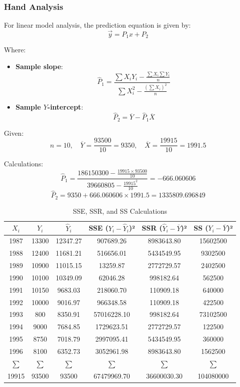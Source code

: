 \documentclass[12pt]{article}
\begin{document}
\subsubsection*{Hand Analysis}

For linear model analysis, the prediction equation is given by:
\[
\vec{y} = P_1 x + P_2
\]

Where:

\begin{itemize}
    \item \textbf{Sample slope}:
    \[
    \hat{P}_1 = \frac{\sum X_i Y_i - \frac{\sum X_i \sum Y_i}{n}}{\sum X_i^2 - \frac{(\sum X_i)^2}{n}}
    \]
    \item \textbf{Sample \( Y \)-intercept}:
    \[
    \hat{P}_2 = \overline{Y} - \hat{P}_1 \overline{X}
    \]
\end{itemize}

Given:
\[
n = 10, \quad \overline{Y} = \frac{93500}{10} = 9350, \quad \overline{X} = \frac{19915}{10} = 1991.5
\]

Calculations:
\[
\hat{P}_1 = \frac{186150300 - \frac{19915 \times 93500}{10}}{39660805 - \frac{19915^2}{10}} = -666.060606
\]
\[
\hat{P}_2 = 9350 + 666.060606 \times 1991.5 = 1335809.696849
\]

\begin{table}[h!]
    \centering
    \caption{SSE, SSR, and SS Calculations}
    \begin{tabular}{cccccc}
        \toprule
        \(X_i\) & \(Y_i\) & \(\hat{Y}_i\) & SSE (\(Y_i - \hat{Y}_i\))² & SSR (\(\hat{Y}_i - \overline{Y}\))² & SS (\(Y_i - \overline{Y}\))² \\
        \midrule
        1987 & 13300 & 12347.27 & 907689.26 & 8983643.80 & 15602500 \\
        1988 & 12400 & 11681.21 & 516656.01 & 5434549.95 & 9302500 \\
        1989 & 10900 & 11015.15 & 13259.87 & 2772729.57 & 2402500 \\
        1990 & 10100 & 10349.09 & 62046.28 & 998182.64 & 562500 \\
        1991 & 10150 & 9683.03 & 218060.70 & 110909.18 & 640000 \\
        1992 & 10000 & 9016.97 & 966348.58 & 110909.18 & 422500 \\
        1993 & 800 & 8350.91 & 57016228.10 & 998182.64 & 73102500 \\
        1994 & 9000 & 7684.85 & 1729623.51 & 2772729.57 & 122500 \\
        1995 & 8750 & 7018.79 & 2997095.41 & 5434549.95 & 360000 \\
        1996 & 8100 & 6352.73 & 3052961.98 & 8983643.80 & 1562500 \\
        \midrule
        \(\sum\) & \(\sum\) & \(\sum\) & \(\sum\) & \(\sum\) & \(\sum\) \\
        19915 & 93500 & 93500 & 67479969.70 & 36600030.30 & 104080000 \\
        \bottomrule
    \end{tabular}
\end{table}
\end{document}
